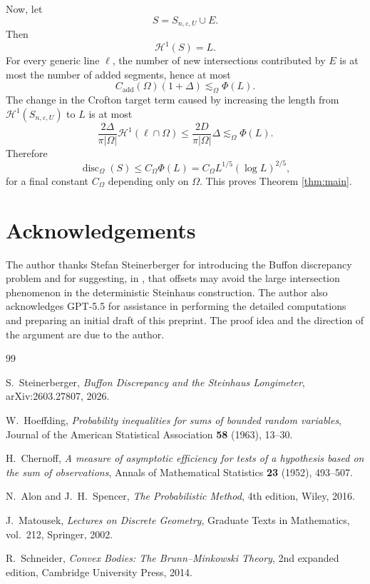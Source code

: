 \documentclass[11pt]{article}
\newcommand{\cH}{\mathcal H}
\newcommand{\eps}{\varepsilon}
\begin{document}
\bigskip
\noindent
Now, let
\[
        S=S_{n,\eps,U}\cup E.
\]
Then
\[
        \cH^1(S)=L.
\]
For every generic line $\ell$, the number of new intersections contributed by $E$ is at most the number of added segments, hence at most
\[
        C_{\mathrm{add}}(\Omega)(1+\Delta)
        \lesssim_\Omega
        \Phi(L).
\]
The change in the Crofton target term caused by increasing the length from $\cH^1(S_{n,\eps,U})$ to $L$ is at most
\[
        \frac{2\Delta}{\pi|\Omega|}
        \cH^1(\ell\cap\Omega)
        \le
        \frac{2D}{\pi|\Omega|}\Delta
        \lesssim_\Omega
        \Phi(L).
\]
Therefore
\[
        \operatorname{disc}_\Omega(S)
        \le
        C_\Omega\Phi(L)
        =
        C_\Omega L^{1/5}(\log L)^{2/5},
\]
for a final constant $C_\Omega$ depending only on $\Omega$. This proves Theorem \ref{thm:main}.

\section*{Acknowledgements} The author thanks Stefan Steinerberger for introducing the Buffon discrepancy problem and for suggesting, in \cite{SteinerbergerBuffon}, that offsets may avoid the large intersection phenomenon in the deterministic Steinhaus construction. The author also acknowledges GPT-5.5 for assistance in performing the detailed computations and preparing an initial draft of this preprint. The proof idea and the direction of the argument are due to the author.

\begin{thebibliography}{99}

S.~Steinerberger,
\emph{Buffon Discrepancy and the Steinhaus Longimeter},
arXiv:2603.27807, 2026.

W.~Hoeffding,
\emph{Probability inequalities for sums of bounded random variables},
Journal of the American Statistical Association \textbf{58} (1963), 13--30.

H.~Chernoff,
\emph{A measure of asymptotic efficiency for tests of a hypothesis based on the sum of observations},
Annals of Mathematical Statistics \textbf{23} (1952), 493--507.

N.~Alon and J.~H.~Spencer,
\emph{The Probabilistic Method},
4th edition, Wiley, 2016.

J.~Matousek,
\emph{Lectures on Discrete Geometry},
Graduate Texts in Mathematics, vol.~212,
Springer, 2002.

R.~Schneider,
\emph{Convex Bodies: The Brunn--Minkowski Theory},
2nd expanded edition,
Cambridge University Press, 2014.

\end{thebibliography}
\end{document}
